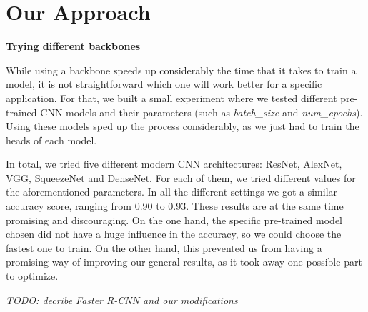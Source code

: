 \section{Our Approach}

\textbf{Trying different backbones}

While using a backbone speeds up considerably the time that it takes to train a model, it is not straightforward which one will work better for a specific application. For that, we built a small experiment where we tested different pre-trained CNN models and their parameters (such as \textit{batch_size} and \textit{num_epochs}). Using these models sped up the process considerably, as we just had to train the heads of each model.

In total, we tried five different modern CNN architectures: ResNet, AlexNet, VGG, SqueezeNet and DenseNet. For each of them, we tried different values for the aforementioned parameters. In all the different settings we got a similar accuracy score, ranging from 0.90 to 0.93. These results are at the same time promising and discouraging. On the one hand, the specific pre-trained model chosen did not have a huge influence in the accuracy, so we could choose the fastest one to train. On the other hand, this prevented us from having a promising way of improving our general results, as it took away one possible part to optimize. 

{\it TODO: decribe Faster R-CNN and our modifications}
